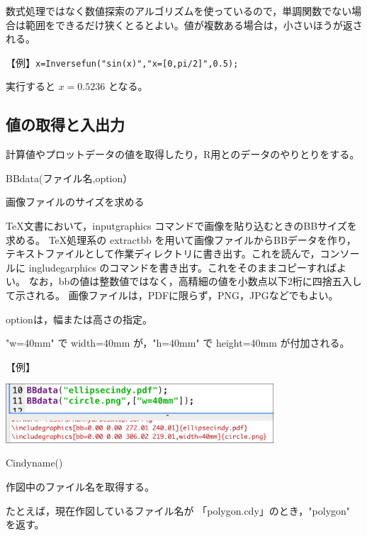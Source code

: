\documentclass[papersize,a4paper,12pt,uplatex]{jsarticle}
\begin{document}
\begin{description}
\begin{description}
数式処理ではなく数値探索のアルゴリズムを使っているので，単調関数でない場合は範囲をできるだけ狭くとるとよい。値が複数ある場合は，小さいほうが返される。


\vspace{\baselineskip}
【例】\verb|x=Inversefun("sin(x)","x=[0,pi/2]",0.5);|

実行すると $x=0.5236$ となる。

\end{description}
\subsection{値の取得と入出力}

  計算値やプロットデータの値を取得したり，R用とのデータのやりとりをする。

\begin{description}
\hypertarget{bbdata}{}
\item[関数]  BBdata(ファイル名,option）
\item[機能]  画像ファイルのサイズを求める
\item[説明]  TeX文書において，inputgraphics コマンドで画像を貼り込むときのBBサイズを求める。
TeX処理系の extractbb を用いて画像ファイルからBBデータを作り，テキストファイルとして作業ディレクトリに書き出す。これを読んで，コンソールに ingludegarphics のコマンドを書き出す。これをそのままコピーすればよい。 なお，bbの値は整数値ではなく，高精細の値を小数点以下2桁に四捨五入して示される。  画像ファイルは，PDFに限らず，PNG，JPGなどでもよい。
  
optionは，幅または高さの指定。

"w=40mm" で  width=40mm が，"h=40mm"  で height=40mm が付加される。

\vspace{\baselineskip}
【例】

\vspace{\baselineskip}
\includegraphics[bb=0.00 0.00 562.03 124.01,width=10cm]{Fig/bbdata.pdf} 


\vspace{\baselineskip}
\hypertarget{cindyname}{}
\item[関数]  Cindyname()
\item[機能]  作図中のファイル名を取得する。
\item[説明]  たとえば，現在作図しているファイル名が 「polygon.cdy」のとき，"polygon" を返す。
    

\end{description}
\end{description}
\end{document}
